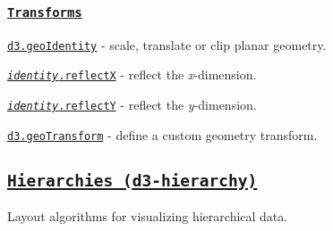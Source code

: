 \subsubsection*{\href{https://github.com/d3/d3-geo/blob/master/README.md#transforms}{\tt Transforms}}


\begin{DoxyItemize}
\item \href{https://github.com/d3/d3-geo/blob/master/README.md#geoIdentity}{\tt d3.\+geo\+Identity} -\/ scale, translate or clip planar geometry.
\item \href{https://github.com/d3/d3-geo/blob/master/README.md#identity_reflectX}{\tt {\itshape identity}.reflectX} -\/ reflect the {\itshape x}-\/dimension.
\item \href{https://github.com/d3/d3-geo/blob/master/README.md#identity_reflectY}{\tt {\itshape identity}.reflectY} -\/ reflect the {\itshape y}-\/dimension.
\item \href{https://github.com/d3/d3-geo/blob/master/README.md#geoTransform}{\tt d3.\+geo\+Transform} -\/ define a custom geometry transform.
\end{DoxyItemize}

\subsection*{\href{https://github.com/d3/d3-hierarchy}{\tt Hierarchies (d3-\/hierarchy)}}

Layout algorithms for visualizing hierarchical data.



